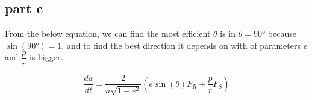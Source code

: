 \subsection{part c}

From the below equation, we can find the most efficient $\theta$ is in $\theta = \ang{90}$ because $\sin(\ang{90}) = 1$, and to find the best direction it depends on with of parameters $e$ and $\dfrac{p}{r}$ is bigger.

\begin{equation}
    \dfrac{da}{dt} = \dfrac{2}{n\sqrt{1-e^2}} \left( e\sin(\theta) F_R + \dfrac{p}{r}F_S\right)
\end{equation}